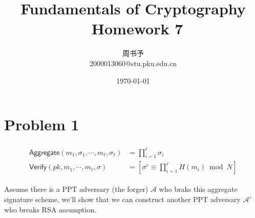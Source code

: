 \documentclass[8pt]{article}
\title{\heiti\zihao{1} Fundamentals  of Cryptography \ Homework 7}
\author{\kaishu\zihao{-3} 周书予\\2000013060@stu.pku.edu.cn}
\date{\today}
\theoremstyle{compact}
\def\Pr#1{\text{Pr}\left[{#1}\right]}
\def\Enc{\textsf{Enc}}
\def\Dec{\textsf{Dec}}
\def\Gen{\textsf{Gen}}
\begin{document}
\large
{}
\pagestyle{plain}



\maketitle

\def\Gen{\textsf{Gen}}
\def\Enc{\textsf{Enc}}
\def\Dec{\textsf{Dec}}
\def\Sign{\textsf{Sign}}
\def\Verify{\textsf{Verify}}
\def\Pr{\text{Pr}}
\def\poly{\text{poly}}

\def\Agg{\textsf{Aggregate}}

\section*{Problem 1}
\begin{align*}
	\begin{split}
		\Agg(m_1, \sigma_1, \cdots, m_{\ell}, \sigma_{\ell}) &= \prod_{i=1}^{\ell}\sigma_i \\
		\Verify(pk, m_1, \cdots, m_{\ell}, \sigma) &= \left[\sigma^{e} \equiv \prod_{i=1}^{\ell}H(m_i) \bmod N\right]
	\end{split}
\end{align*}

Assume there is a PPT adversary (the forger) $\mathcal A$ who braks this aggregate signature scheme, we'll show that we can construct another PPT adversary $\mathcal A'$ who breaks RSA assumption.
\end{document}
